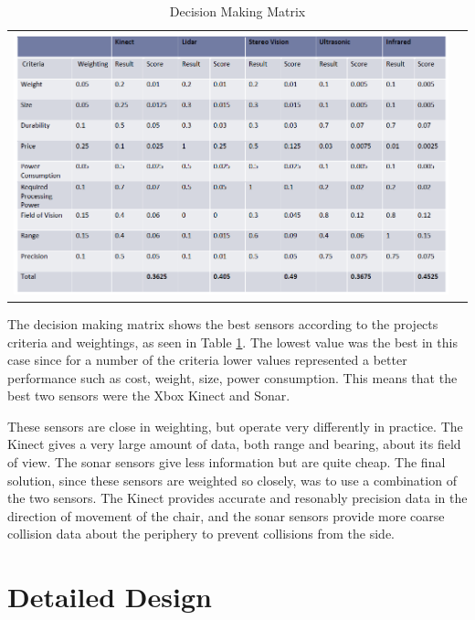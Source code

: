 \documentclass[oneside,final,a4paper]{report}
\begin{document}
    \begin{table}[hbt]
        \caption{Decision Making Matrix}
        \centering
        \begin{tabular}{cc}
        \includegraphics[scale=0.35]{decision_matrix}\\
        \end{tabular}
        \label{tab:decision_matrix}
    \end{table}

The decision making matrix shows the best sensors according to the projects criteria and weightings, as seen in Table \ref{tab:decision_matrix}. The lowest value was the best in this case since for a number of the criteria lower values represented a better performance such as cost, weight, size, power consumption. This means that the best two sensors were the Xbox Kinect and Sonar. 

These sensors are close in weighting, but operate very differently in practice. The Kinect gives a very large amount of data, both range and bearing, about its field of view. The sonar sensors give less information but are quite cheap. The final solution, since these sensors are weighted so closely, was to use a combination of the two sensors. The Kinect provides accurate and resonably precision data in the direction of movement of the chair, and the sonar sensors provide more coarse collision data about the periphery to prevent collisions from the side.

\chapter{Detailed Design}
\end{document}
